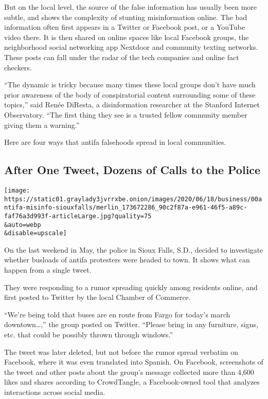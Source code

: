 But on the local level, the source of the false information has usually
been more subtle, and shows the complexity of stunting misinformation
online. The bad information often first appears in a Twitter or Facebook
post, or a YouTube video there. It is then shared on online spaces like
local Facebook groups, the neighborhood social networking app Nextdoor
and community texting networks. These posts can fall under the radar of
the tech companies and online fact checkers.

``The dynamic is tricky because many times these local groups don't have
much prior awareness of the body of conspiratorial content surrounding
some of these topics,'' said Renée DiResta, a disinformation researcher
at the Stanford Internet Observatory. ``The first thing they see is a
trusted fellow community member giving them a warning.''

Here are four ways that antifa falsehoods spread in local communities.

\hypertarget{after-one-tweet-dozens-of-calls-to-the-police}{%
\subsection{After One Tweet, Dozens of Calls to the
Police}\label{after-one-tweet-dozens-of-calls-to-the-police}}

\texttt{[image: https://static01.graylady3jvrrxbe.onion/images/2020/06/18/business/00antifa-misinfo-siouxfalls/merlin\_173672286\_90c2f87a-e961-46f5-a89c-faf76a3d993f-articleLarge.jpg?quality=75\\\&auto=webp\\\&disable=upscale]}

On the last weekend in May, the police in Sioux Falls, S.D., decided to
investigate whether busloads of antifa protesters were headed to town.
It shows what can happen from a single tweet.

They were responding to a rumor spreading quickly among residents
online, and first posted to Twitter by the local Chamber of Commerce.

``We're being told that buses are en route from Fargo for today's march
downtown\ldots{},'' the group posted on Twitter. ``Please bring in any
furniture, signs, etc. that could be possibly thrown through windows.''

The tweet was later deleted, but not before the rumor spread verbatim on
Facebook, where it was even translated into Spanish. On Facebook,
screenshots of the tweet and other posts about the group's message
collected more than 4,600 likes and shares according to CrowdTangle, a
Facebook-owned tool that analyzes interactions across social media.

